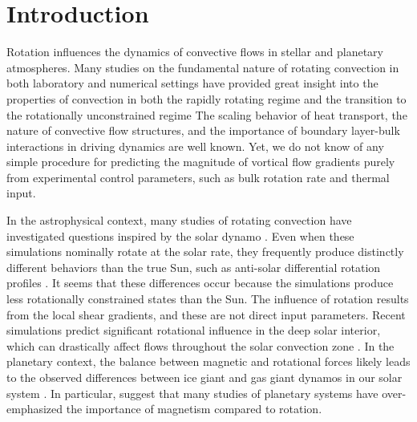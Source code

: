 \documentclass[twocolumn, amsmath, amsfonts, amssymb, trackchanges]{aastex62}
\begin{document}
\section{Introduction}
\label{sec:intro}
Rotation influences the dynamics of convective flows in
stellar and planetary atmospheres.
Many studies on the fundamental nature of
rotating convection in both laboratory and numerical settings
have provided great insight into the properties of convection 
in both the rapidly rotating regime 
and the transition to the rotationally unconstrained regime 
\citep{king&all2009, zhong&all2009, schmitz&tilgner2009, king&all2012, julien&all2012, king&all2013, ecke&niemela2014, stellmach&all2014, cheng&all2015, gastine&all2016}
The scaling behavior of heat transport, the nature of convective flow
structures, and the importance of boundary layer-bulk interactions in driving dynamics are well known.
Yet, we do not know of any simple procedure for predicting the magnitude of vortical flow gradients 
purely from experimental control parameters, such as bulk rotation rate and thermal input.

In the astrophysical context,
many studies of rotating convection have investigated questions inspired by the solar dynamo
\citep{glatzmaier&gilman1982, busse2002, brown&all2008,
brown&all2010, brown&all2011, augustson&all2012, guerrero&all2013, kapyla&all2014}.
Even when these simulations nominally rotate at the solar rate,
they frequently produce distinctly different behaviors than the true Sun,
such as anti-solar differential rotation profiles  \citep{gastine&all2014}.
It seems that these differences occur because the simulations produce less rotationally 
constrained states than the Sun. 
The influence of rotation results from the local 
shear gradients, and these are not direct input parameters.
Recent simulations predict significant rotational influence in the deep solar interior, 
which can drastically affect flows throughout the solar convection zone 
\citep{featherstone&hindman2016, greer&all2016}. 
In the planetary context, the balance between magnetic
and rotational forces likely leads to the observed differences between ice
giant and gas giant dynamos in our solar system \citep{soderlund&all2015}.
In particular, \cite{aurnou&king2017} suggest that many studies of planetary systems
have over-emphasized the importance of magnetism compared to rotation.
\end{document}
